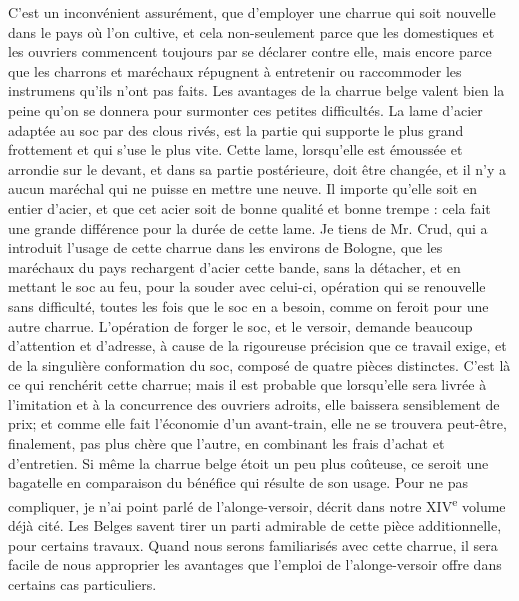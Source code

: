 C'est un inconvénient assurément, que d'employer une charrue qui soit nouvelle dans le pays où l'on cultive, et cela non-seulement parce que les domestiques et les ouvriers commencent toujours par se déclarer contre elle, mais encore parce que les charrons et maréchaux répugnent à entretenir ou raccommoder les instrumens qu'ils n'ont pas faits. Les avantages de la charrue belge valent bien la peine qu'on se donnera pour surmonter ces petites difficultés. La lame d'acier adaptée au soc par des clous rivés, est la partie qui supporte le plus grand frottement et qui s'use le plus vite. Cette lame,\setcounter{page}{408} lorsqu'elle est émoussée et arrondie sur le devant, et dans sa partie postérieure, doit être changée, et il n'y a aucun maréchal qui ne puisse en mettre une neuve. Il importe qu'elle soit en entier d'acier, et que cet acier soit de bonne qualité et bonne trempe : cela fait une grande différence pour la durée de cette lame. Je tiens de Mr. Crud, qui a introduit l'usage de cette charrue dans les environs de Bologne, que les maréchaux du pays rechargent d'acier cette bande, sans la détacher, et en mettant le soc au feu, pour la souder avec celui-ci, opération qui se renouvelle sans difficulté, toutes les fois que le soc en a besoin, comme on feroit pour une autre charrue. L'opération de forger le soc, et le versoir, demande beaucoup d'attention et d'adresse, à cause de la rigoureuse précision que ce travail exige, et de la singulière conformation du soc, composé de quatre pièces distinctes. C'est là ce qui renchérit cette charrue; mais il est probable que lorsqu'elle sera livrée à l'imitation et à la concurrence des ouvriers adroits, elle baissera sensiblement de prix; et comme elle fait l'économie d'un avant-train, elle ne se trouvera peut-être, finalement, pas plus chère que l'autre, en combinant les frais d'achat et d'entretien. Si même la charrue belge étoit\setcounter{page}{409} un peu plus coûteuse, ce seroit une bagatelle en comparaison du bénéfice qui résulte de son usage.
Pour ne pas compliquer, je n'ai point parlé de l'alonge-versoir, décrit dans notre XIV\textsuperscript{e} volume déjà cité. Les Belges savent tirer un parti admirable de cette pièce additionnelle, pour certains travaux. Quand nous serons familiarisés avec cette charrue, il sera facile de nous approprier les avantages que l'emploi de l'alonge-versoir offre dans certains cas particuliers.
